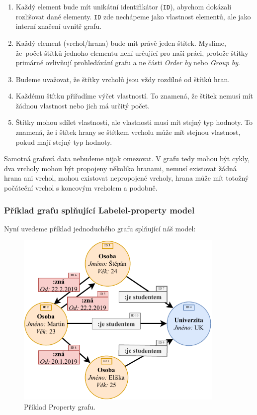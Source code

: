 \begin{enumerate}

\item
Každý element bude mít unikátní identifikátor (\texttt{ID}), abychom dokázali rozlišovat dané elementy.
\texttt{ID} zde nechápeme jako vlastnost elementů, ale jako interní značení uvnitř grafu.

\item
Každý element (vrchol/hrana) bude mít právě jeden štítek.
Myslíme, že~počet štítků jednoho elementu není určující pro naši práci, protože štítky primárně ovlivňují prohledávání grafu a ne části \textit{Order by} nebo \textit{Group by}.

\item
Budeme uvažovat, že štítky vrcholů jsou vždy rozdílné od štítků hran.

\item
Každému štítku přiřadíme výčet vlastností.
To znamená, že štítek nemusí mít žádnou vlastnost nebo jich má určitý počet.

\item
Štítky mohou sdílet vlastnosti, ale vlastnosti musí mít stejný typ hodnoty.
To znamená, že i štítek hrany se štítkem vrcholu může mít stejnou vlastnost, pokud mají stejný typ hodnoty.

\end{enumerate}

Samotná grafová data nebudeme nijak omezovat.
V grafu tedy mohou být cykly, dva vrcholy mohou být propojeny několika hranami, nemusí existovat žádná hrana ani vrchol, mohou existovat nepropojené vrcholy, hrana může mít totožný počáteční vrchol s koncovým vrcholem a podobně.

\subsubsection{Příklad grafu splňující Labelel-property model}
Nyní uvedeme příklad jednoduchého grafu splňující náš model:

\begin{figure}[!htp]
\includegraphics[width=100mm]{../img/propertyexample.pdf}\centering
\caption{Příklad Property grafu.}
\label{figure.propertygraphexample}
\end{figure}

